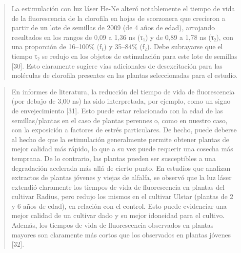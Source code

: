 \documentclass[
]{article}
\begin{document}
\begin{quote}
La estimulación con luz láser He-Ne alteró notablemente el tiempo de
vida de la fluorescencia de la clorofila en hojas de scorzonera que
crecieron a partir de un lote de semillas de 2009 (de 4 años de edad),
arrojando resultados en los rangos de 0,09 a 1,36 ns (τ₁) y de 0,89 a
1,78 ns (τ₂), con una proporción de 16--100\% (f₁) y 35--84\% (f₂). Debe
subrayarse que el tiempo τ₂ se redujo en los objetos de estimulación
para este lote de semillas {[}30{]}. Esto claramente sugiere vías
adicionales de desexcitación para las moléculas de clorofila presentes
en las plantas seleccionadas para el estudio.
\end{quote}

\begin{quote}
En informes de literatura, la reducción del tiempo de vida de
fluorescencia (por debajo de 3,00 ns) ha sido interpretada, por ejemplo,
como un signo de envejecimiento {[}31{]}. Esto puede estar relacionado
con la edad de las semillas/plantas en el caso de plantas perennes o,
como en nuestro caso, con la exposición a factores de estrés
particulares. De hecho, puede deberse al hecho de que la estimulación
generalmente permite obtener plantas de mejor calidad más rápido, lo que
a su vez puede requerir una cosecha más temprana. De lo contrario, las
plantas pueden ser susceptibles a una degradación acelerada más allá de
cierto punto. En estudios que analizan extractos de plantas jóvenes y
viejas de alfalfa, se observó que la luz láser extendió claramente los
tiempos de vida de fluorescencia en plantas del cultivar Radius, pero
redujo los mismos en el cultivar Ulstar (plantas de 2 y 6 años de edad),
en relación con el control. Esto puede evidenciar una mejor calidad de
un cultivar dado y su mejor idoneidad para el cultivo. Además, los
tiempos de vida de fluorescencia observados en plantas mayores son
claramente más cortos que los observados en plantas jóvenes {[}32{]}.
\end{quote}
\end{document}
